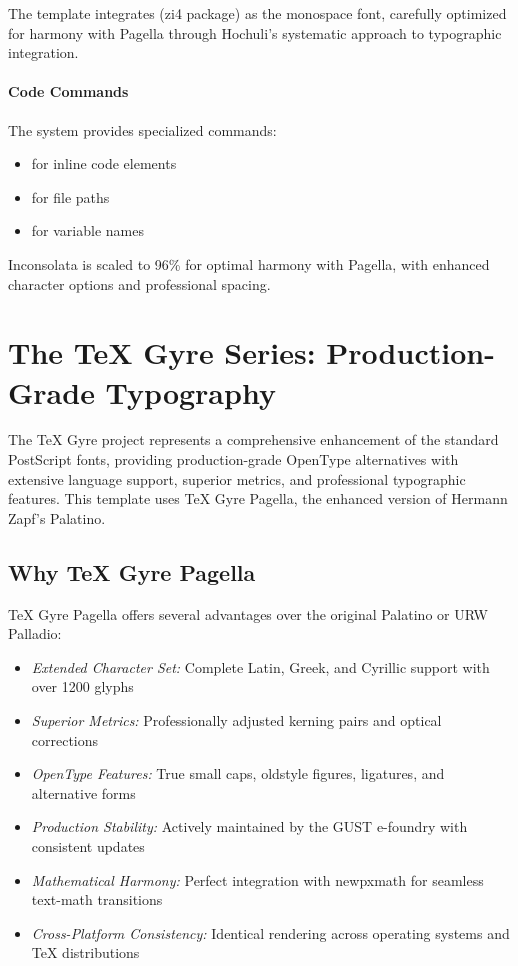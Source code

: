 \documentclass[11pt]{article}
\begin{document}
The template integrates  (zi4 package) as the monospace font, carefully optimized for harmony with Pagella through Hochuli's systematic approach to typographic integration.

\paragraph{Code Commands} The system provides specialized commands:
\begin{itemize}
\item {} for inline code elements
\item {} for file paths  
\item {} for variable names
\end{itemize}

Inconsolata is scaled to 96\% for optimal harmony with Pagella, with enhanced character options and professional spacing.

\section{The TeX Gyre Series: Production-Grade Typography}

The TeX Gyre project represents a comprehensive enhancement of the standard PostScript fonts, providing production-grade OpenType alternatives with extensive language support, superior metrics, and professional typographic features. This template uses TeX Gyre Pagella, the enhanced version of Hermann Zapf's Palatino.

\subsection{Why TeX Gyre Pagella}

TeX Gyre Pagella offers several advantages over the original Palatino or URW Palladio:

\begin{itemize}
\item \emph{Extended Character Set:} Complete Latin, Greek, and Cyrillic support with over 1200 glyphs
\item \emph{Superior Metrics:} Professionally adjusted kerning pairs and optical corrections
\item \emph{OpenType Features:} True small caps, oldstyle figures, ligatures, and alternative forms
\item \emph{Production Stability:} Actively maintained by the GUST e-foundry with consistent updates
\item \emph{Mathematical Harmony:} Perfect integration with newpxmath for seamless text-math transitions
\item \emph{Cross-Platform Consistency:} Identical rendering across operating systems and TeX distributions
\end{itemize}
\end{document}
